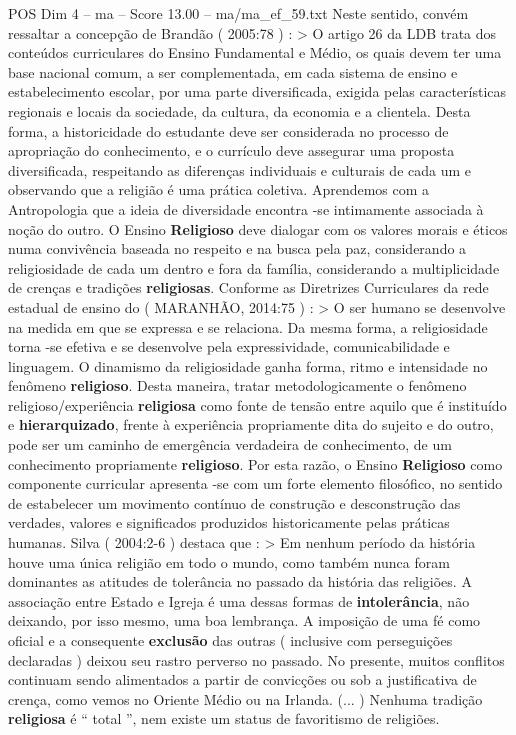 \begin{textsample}{POS Dim 4 – ma – Score 13.00 – ma/ma\_ef\_59.txt}
Neste sentido, convém ressaltar a concepção de Brandão ( 2005:78 ) : > O artigo 26 da LDB trata dos conteúdos curriculares do Ensino Fundamental e Médio, os quais devem ter uma base nacional comum, a ser complementada, em cada sistema de ensino e estabelecimento escolar, por uma parte diversificada, exigida pelas características regionais e locais da sociedade, da cultura, da economia e a clientela.
Desta forma, a historicidade do estudante deve ser considerada no processo de apropriação do conhecimento, e o currículo deve assegurar uma proposta diversificada, respeitando as diferenças individuais e culturais de cada um e observando que a religião é uma prática coletiva.
Aprendemos com a Antropologia que a ideia de diversidade encontra -se intimamente associada à noção do outro.
O Ensino \textbf{Religioso} deve dialogar com os valores morais e éticos numa convivência baseada no respeito e na busca pela paz, considerando a religiosidade de cada um dentro e fora da família, considerando a multiplicidade de crenças e tradições \textbf{religiosas}.
Conforme as Diretrizes Curriculares da rede estadual de ensino do ( MARANHÃO, 2014:75 ) : > O ser humano se desenvolve na medida em que se expressa e se relaciona.
Da mesma forma, a religiosidade torna -se efetiva e se desenvolve pela expressividade, comunicabilidade e linguagem.
O dinamismo da religiosidade ganha forma, ritmo e intensidade no fenômeno \textbf{religioso}.
Desta maneira, tratar metodologicamente o fenômeno religioso/experiência \textbf{religiosa} como fonte de tensão entre aquilo que é instituído e \textbf{hierarquizado}, frente à experiência propriamente dita do sujeito e do outro, pode ser um caminho de emergência verdadeira de conhecimento, de um conhecimento propriamente \textbf{religioso}.
Por esta razão, o Ensino \textbf{Religioso} como componente curricular apresenta -se com um forte elemento filosófico, no sentido de estabelecer um movimento contínuo de construção e desconstrução das verdades, valores e significados produzidos historicamente pelas práticas humanas.
Silva ( 2004:2-6 ) destaca que : > Em nenhum período da história houve uma única religião em todo o mundo, como também nunca foram dominantes as atitudes de tolerância no passado da história das religiões.
A associação entre Estado e Igreja é uma dessas formas de \textbf{intolerância}, não deixando, por isso mesmo, uma boa lembrança.
A imposição de uma fé como oficial e a consequente \textbf{exclusão} das outras ( inclusive com perseguições declaradas ) deixou seu rastro perverso no passado.
No presente, muitos conflitos continuam sendo alimentados a partir de convicções ou sob a justificativa de crença, como vemos no Oriente Médio ou na Irlanda. (... ) Nenhuma tradição \textbf{religiosa} é “ total ”, nem existe um status de favoritismo de religiões.

\end{textsample}
